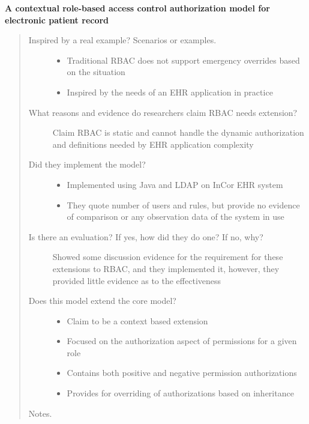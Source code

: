 \documentclass[letterpaper,10pt,english]{sphinxmanual}
\begin{document}
\textbf{A contextual role-based access control authorization model for electronic patient record}
\begin{quote}
\begin{description}
\item[{Inspired by a real example? Scenarios or examples.}] \leavevmode\begin{itemize}
\item {} 
Traditional RBAC does not support emergency overrides based on the situation

\item {} 
Inspired by the needs of an EHR application in practice

\end{itemize}

\item[{What reasons and evidence do researchers claim RBAC needs extension?}] \leavevmode
Claim RBAC is static and cannot handle the dynamic authorization and definitions needed by EHR application complexity

\item[{Did they implement the model?}] \leavevmode\begin{itemize}
\item {} 
Implemented using Java and LDAP on InCor EHR system

\item {} 
They quote number of users and rules, but provide no evidence of comparison or any observation data of the system in use

\end{itemize}

\item[{Is there an evaluation? If yes, how did they do one? If no, why?}] \leavevmode
Showed some discussion evidence for the requirement for these extensions to RBAC, and they implemented it, however, they provided little evidence as to the effectiveness

\item[{Does this model extend the core model?}] \leavevmode\begin{itemize}
\item {} 
Claim to be a context based extension

\item {} 
Focused on the authorization aspect of permissions for a given role

\item {} 
Contains both positive and negative permission authorizations

\item {} 
Provides for overriding of authorizations based on inheritance

\end{itemize}

\end{description}

Notes.
\end{quote}
\end{document}
